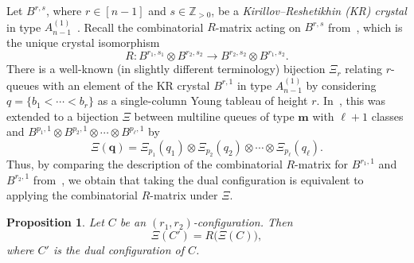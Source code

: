 \documentclass[reqno]{amsart}
\newcommand{\0}{\phantom{c}}
\newcommand{\mm}{\mathbf{m}}
\newcommand{\qq}{\mathbf{q}}
\newcommand{\ZZ}{\mathbb{Z}}
\newcommand{\defn}[1]{{\color{darkred}\emph{#1}}} %
\theoremstyle{plain}
\newtheorem{prop}[thm]{Proposition}
\theoremstyle{definition}
\numberwithin{equation}{section}
\begin{document}
Let $B^{r,s}$, where $r \in [n-1]$ and $s \in \ZZ_{>0}$, be a \defn{Kirillov--Reshetikhin (KR) crystal} in type $A_{n-1}^{(1)}$~\cite{KKMMNN92}.
Recall the combinatorial $R$-matrix acting on $B^{r,s}$ from~\cite{NY97,Shimozono02}, which is the unique crystal isomorphism
\[
R \colon B^{r_1,s_1} \otimes B^{r_2,s_2} \to B^{r_2,s_2} \otimes B^{r_1,s_2}.
\]
There is a well-known (in slightly different terminology) bijection $\Xi_r$ relating $r$-queues with an element of the KR crystal $B^{r,1}$ in type $A_{n-1}^{(1)}$ by considering $q = \{b_1 < \cdots < b_r\}$  as a single-column Young tableau of height $r$.
In~\cite{KMO15}, this was extended to a bijection $\Xi$ between multiline queues of type $\mm$ with $\ell+1$ classes and $B^{p_1,1} \otimes B^{p_2,1} \otimes \dotsm \otimes B^{p_{\ell},1}$ by
\[
\Xi(\qq) = \Xi_{p_1}(q_1) \otimes \Xi_{p_2}(q_2) \otimes \dotsm \otimes \Xi_{p_{\ell}}(q_{\ell}).
\]
Thus, by comparing the description of the combinatorial $R$-matrix for $B^{r_1,1}$ and $B^{r_2,1}$ from~\cite{NY97}, we obtain that taking the dual configuration is equivalent to applying the combinatorial $R$-matrix under $\Xi$.

\begin{prop}
Let $C$ be an $(r_1, r_2)$-configuration. Then
\[
\Xi(C') = R\bigl( \Xi(C) \bigr),
\]
where $C'$ is the dual configuration of $C$.
\end{prop}
\end{document}
